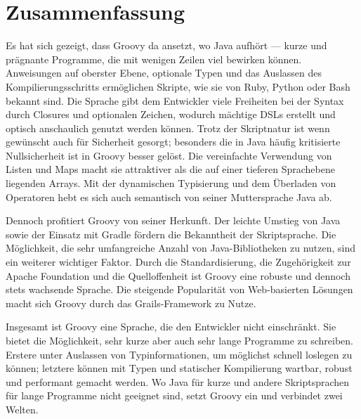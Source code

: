 
\section{Zusammenfassung}\label{sec:zusammenfassung}

Es hat sich gezeigt, dass Groovy da ansetzt, wo Java aufhört --- kurze und prägnante Programme, die mit wenigen Zeilen viel bewirken können.
Anweisungen auf oberster Ebene, optionale Typen und das Auslassen des Kompilierungsschritts ermöglichen Skripte, wie sie von Ruby, Python oder Bash bekannt sind.
Die Sprache gibt dem Entwickler viele Freiheiten bei der Syntax durch Closures und optionalen Zeichen, wodurch mächtige DSLs erstellt und optisch anschaulich genutzt werden können.
Trotz der Skriptnatur ist wenn gewünscht auch für Sicherheit gesorgt;
besonders die in Java häufig kritisierte Nullsicherheit ist in Groovy besser gelöst.
Die vereinfachte Verwendung von Listen und Maps macht sie attraktiver als die auf einer tieferen Sprachebene liegenden Arrays.
Mit der dynamischen Typisierung und dem Überladen von Operatoren hebt es sich auch semantisch von seiner Muttersprache Java ab.

Dennoch profitiert Groovy von seiner Herkunft.
Der leichte Umstieg von Java sowie der Einsatz mit Gradle fördern die Bekanntheit der Skriptsprache.
Die Möglichkeit, die sehr umfangreiche Anzahl von Java-Bibliotheken zu nutzen, sind ein weiterer wichtiger Faktor.
Durch die Standardisierung, die Zugehörigkeit zur Apache Foundation und die Quelloffenheit ist Groovy eine robuste und dennoch stets wachsende Sprache.
Die steigende Popularität von Web-basierten Lösungen macht sich Groovy durch das Grails-Framework zu Nutze.

Insgesamt ist Groovy eine Sprache, die den Entwickler nicht einschränkt.
Sie bietet die Möglichkeit, sehr kurze aber auch sehr lange Programme zu schreiben.
Erstere unter Auslassen von Typinformationen, um möglichst schnell loslegen zu können;
letztere können mit Typen und statischer Kompilierung wartbar, robust und performant gemacht werden.
Wo Java für kurze und andere Skriptsprachen für lange Programme nicht geeignet sind, setzt Groovy ein und verbindet zwei Welten.






